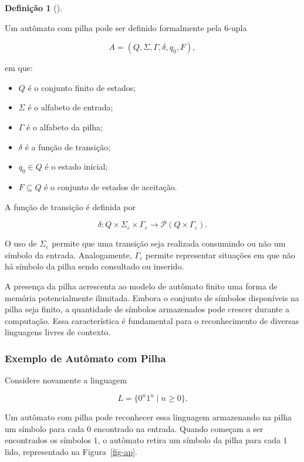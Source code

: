 \documentclass[
  brazilian,
  letterpaper,
]{book}
\providecommand{\tightlist}{%
  \setlength{\itemsep}{0pt}\setlength{\parskip}{0pt}}
\theoremstyle{plain}
\theoremstyle{definition}
\newtheorem{definition}{Definição}[chapter]
\theoremstyle{remark}
\begin{document}
\begin{definition}[]\protect\hypertarget{def-ap}{}\label{def-ap}

Um autômato com pilha pode ser definido formalmente pela 6-upla

\[
A=(Q,\Sigma,\Gamma,\delta,q_0,F),
\]

em que:

\begin{itemize}
\tightlist
\item
  \(Q\) é o conjunto finito de estados;
\item
  \(\Sigma\) é o alfabeto de entrada;
\item
  \(\Gamma\) é o alfabeto da pilha;
\item
  \(\delta\) é a função de transição;
\item
  \(q_0\in Q\) é o estado inicial;
\item
  \(F\subseteq Q\) é o conjunto de estados de aceitação.
\end{itemize}

\end{definition}

A função de transição é definida por

\[
\delta:
Q\times\Sigma_\varepsilon\times\Gamma_\varepsilon
\rightarrow
\mathcal{P}(Q\times\Gamma_\varepsilon).
\]

O uso de \(\Sigma_\varepsilon\) permite que uma transição seja realizada
consumindo ou não um símbolo da entrada. Analogamente,
\(\Gamma_\varepsilon\) permite representar situações em que não há
símbolo da pilha sendo consultado ou inserido.

A presença da pilha acrescenta ao modelo de autômato finito uma forma de
memória potencialmente ilimitada. Embora o conjunto de símbolos
disponíveis na pilha seja finito, a quantidade de símbolos armazenados
pode crescer durante a computação. Essa característica é fundamental
para o reconhecimento de diversas linguagens livres de contexto.

\subsubsection{Exemplo de Autômato com
Pilha}\label{exemplo-de-autuxf4mato-com-pilha}

Considere novamente a linguagem

\[
L=\{0^n1^n\mid n\geq0\}.
\]

Um autômato com pilha pode reconhecer essa linguagem armazenando na
pilha um símbolo para cada \(0\) encontrado na entrada. Quando começam a
ser encontrados os símbolos \(1\), o autômato retira um símbolo da pilha
para cada \(1\) lido, representado na Figura~\ref{fig-ap}.
\end{document}
